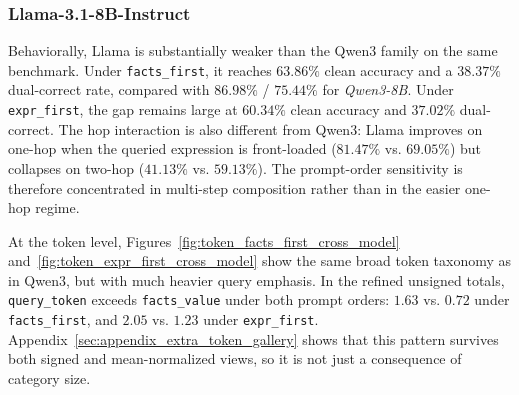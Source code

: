\documentclass[11pt]{article}
\begin{document}
\subsubsection{Llama-3.1-8B-Instruct}
Behaviorally, Llama is substantially weaker than the Qwen3 family on the same benchmark. Under \texttt{facts\_first}, it reaches $63.86\%$ clean accuracy and a $38.37\%$ dual-correct rate, compared with $86.98\%$ / $75.44\%$ for \textit{Qwen3-8B}. Under \texttt{expr\_first}, the gap remains large at $60.34\%$ clean accuracy and $37.02\%$ dual-correct. The hop interaction is also different from Qwen3: Llama improves on one-hop when the queried expression is front-loaded ($81.47\%$ vs. $69.05\%$) but collapses on two-hop ($41.13\%$ vs. $59.13\%$). The prompt-order sensitivity is therefore concentrated in multi-step composition rather than in the easier one-hop regime.

At the token level, Figures~\ref{fig:token_facts_first_cross_model} and~\ref{fig:token_expr_first_cross_model} show the same broad token taxonomy as in Qwen3, but with much heavier query emphasis. In the refined unsigned totals, \texttt{query\_token} exceeds \texttt{facts\_value} under both prompt orders: $1.63$ vs. $0.72$ under \texttt{facts\_first}, and $2.05$ vs. $1.23$ under \texttt{expr\_first}. Appendix~\ref{sec:appendix_extra_token_gallery} shows that this pattern survives both signed and mean-normalized views, so it is not just a consequence of category size.
\end{document}
